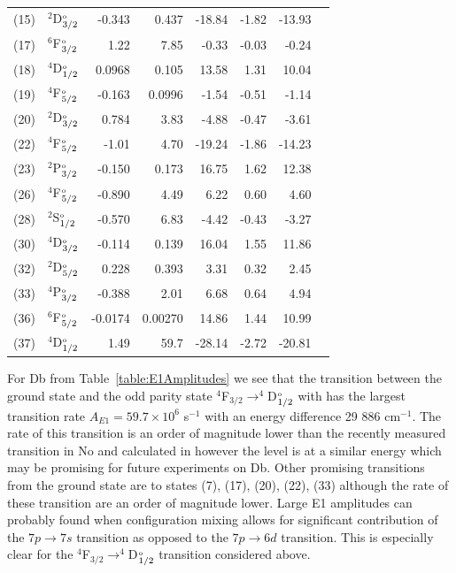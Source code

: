 \documentclass[10pt,a4paper, twoside, openright]{report}
\begin{document}
\begin{table}[t!]
\begin{tabular}{cl@{\hspace{0.75cm}}r@{\hspace{0.75cm}}r@{\hspace{0.75cm}}r@{\hspace{0.5cm}}r@{\hspace{0.5cm}}r@{\hspace{0.5cm}}r}
 (15) & $^2$D$^{\rm_o}_{3/2}$  &   -0.343  & 0.437 & -18.84 & -1.82 & -13.93   \\
(17)  & $^6$F$^{\rm_o}_{3/2}$  &    1.22  & 7.85 & -0.33 & -0.03 & -0.24 \\
 (18) & $^4$D$^{\rm_o}_{1/2}$  &    0.0968 & 0.105 & 13.58 & 1.31 & 10.04 \\
 (19) & $^4$F$^{\rm_o}_{5/2}$ &    -0.163 & 0.0996& -1.54 & -0.51 & -1.14 \\
 (20) & $^2$D$^{\rm_o}_{3/2}$  &    0.784 & 3.83 & -4.88 & -0.47 & -3.61 \\
 (22) & $^4$F$^{\rm_o}_{5/2}$  &    -1.01 & 4.70  & -19.24 & -1.86 & -14.23 \\
 (23)  & $^2$P$^{\rm_o}_{3/2}$  &   -0.150 & 0.173 & 16.75 & 1.62 & 12.38 \\
 (26) & $^4$F$^{\rm_o}_{5/2}$  &    -0.890 & 4.49  & 6.22 & 0.60 & 4.60 \\
 (28) & $^2$S$^{\rm_o}_{1/2}$ &     -0.570 & 6.83 & -4.42 & -0.43 & -3.27 \\
 (30) & $^4$D$^{\rm_o}_{3/2}$ &   -0.114 & 0.139 & 16.04 & 1.55 & 11.86  \\
 (32) & $^2$D$^{\rm_o}_{5/2}$ &  0.228 & 0.393 & 3.31 & 0.32 & 2.45 \\
 (33)  & $^4$P$^{\rm_o}_{3/2}$ &   -0.388 & 2.01 & 6.68 &  0.64 & 4.94 \\
 (36) & $^6$F$^{\rm_o}_{5/2}$ &    -0.0174   & 0.00270 & 14.86 & 1.44 & 10.99 \\
 (37)  & $^4$D$^{\rm_o}_{1/2}$  &   1.49 & 59.7 & -28.14 & -2.72 & -20.81 \\
\bottomrule
\bottomrule
\end{tabular}
\end{table}

For Db from Table~\ref{table:E1Amplitudes} we see that the  transition between the ground state and the odd parity state $^4$F$_{3/2} \rightarrow ^4$D$^{\rm_o}_{1/2}$ with has the largest transition rate $A_{E1} = 59.7 \times 10^{6}$ s$^{-1}$ with an energy difference 29 886 cm$^{-1}$. The rate of this transition is an order of magnitude lower than the recently measured transition in No \cite{Laatiaoui2016} and calculated in \cite{Borschevsky2007, Indelicato2007, Liu2007} however the level is at a similar energy which may be promising for future experiments on Db. Other promising transitions from the ground state are to states (7), (17), (20), (22), (33) although the rate of these transition are an order of magnitude lower.  
Large E1 amplitudes can probably found when configuration mixing allows for significant contribution of the 
$7p \rightarrow 7s$ transition as opposed to the  $7p \rightarrow 6d$ transition. This is especially clear for the 
$^4$F$_{3/2} \rightarrow ^4$D$^{\rm_o}_{1/2}$ transition considered above.
\end{document}
